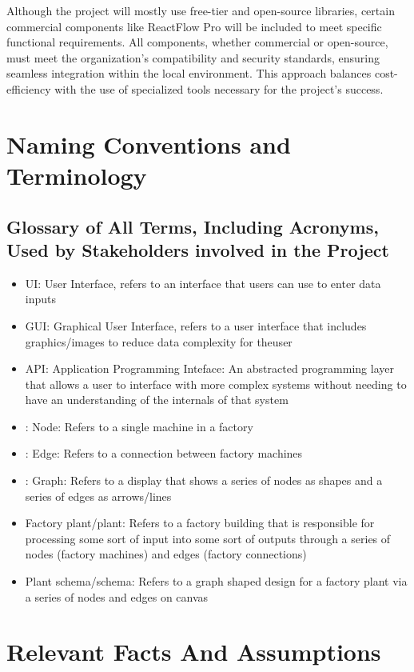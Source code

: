 \documentclass[12pt]{article}
\begin{document}
Although the project will mostly use free-tier and open-source libraries, certain commercial components like ReactFlow Pro will be included to meet specific functional requirements. All components, whether commercial or open-source, must meet the organization’s compatibility and security standards, ensuring seamless integration within the local environment. This approach balances cost-efficiency with the use of specialized tools necessary for the project’s success.








\section{Naming Conventions and Terminology}
\subsection{Glossary of All Terms, Including Acronyms, Used by Stakeholders
involved in the Project}
\begin{itemize}
  \item UI: User Interface, refers to an interface that users can use to enter data inputs
  \item GUI: Graphical User Interface, refers to a user interface that includes graphics/images to reduce data complexity for theuser
  \item API: Application Programming Inteface: An abstracted programming layer that allows a user to interface with more complex systems without needing to have an understanding of the internals of that system
  \item: Node: Refers to a single machine in a factory
  \item: Edge: Refers to a connection between factory machines
  \item: Graph: Refers to a display that shows a series of nodes as shapes and a series of edges as arrows/lines
  \item Factory plant/plant: Refers to a factory building that is responsible for processing some sort of input into some sort of outputs through a series of nodes (factory machines) and edges (factory connections)
  \item Plant schema/schema: Refers to a graph shaped design for a factory plant via a series of nodes and edges on canvas
\end{itemize}


\section{Relevant Facts And Assumptions}
\end{document}
